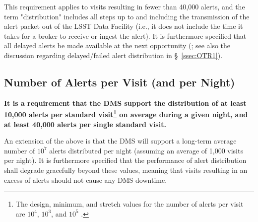\documentclass[DM,authoryear,toc]{lsstdoc}
\begin{document}
This requirement applies to visits resulting in fewer than 40,000 alerts, and the term "distribution" includes all steps up to and including the transmission of the alert packet out of the \gls{LSST} Data Facility (i.e., it does not include the time it takes for a broker to receive or ingest the alert). It is furthermore specified that all delayed alerts be made available at the next opportunity (; see also the discussion regarding delayed/failed alert distribution in \S~\ref{ssec:OTR1}).


\subsection{Number of Alerts per \gls{Visit} (and per Night)}\label{ssec:transN}

{\bf It is a requirement that the \gls{DMS} support the distribution of at least 10,000 alerts per standard visit\footnote{The design, minimum, and stretch values for the number of alerts per visit are $10^4$, $10^3$, and $10^5$ .} on average during a given night, and at least 40,000 alerts per single standard visit.}

An extension of the above is that the \gls{DMS} will support a long-term average number of $10^7$ alerts distributed per night (assuming an average of 1,000 visits per night). It is furthermore specified that the performance of alert distribution shall degrade gracefully beyond these values, meaning that visits resulting in an excess of alerts should not cause any \gls{DMS} downtime.
\end{document}
